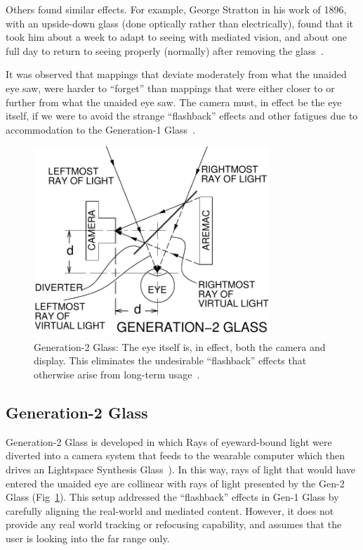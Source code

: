 Others found similar effects. For example, George Stratton in his work of 1896, with an upside-down 
glass
(done optically rather than electrically), found that it took him about a week to adapt to seeing with 
mediated vision, and about one full day to return to seeing properly (normally) after removing the 
glass~\cite{stratton1897vision}.

It was observed that mappings that deviate moderately from what the unaided eye saw, were harder to 
``forget'' than mappings that were either closer to or further from what the unaided eye saw.  The 
camera must, in effect be the eye itself, if we were to avoid the strange ``flashback'' effects and other 
fatigues due to accommodation to the Generation-1 Glass~\cite{schor1987fatigue}.

\begin{figure}
  \center
  \includegraphics[width=3.5in]{ch6/figs/GlassGen2.pdf}
  \caption{Generation-2 Glass: The eye itself is, in effect, both the camera
           and display.  This eliminates the undesirable ``flashback'' effects
           that otherwise arise from long-term usage~\cite{mann2013freeglass}.}
  \label{fig:gentwo}
\end{figure}

\subsection{Generation-2 Glass}
Generation-2 Glass is developed in which Rays of eyeward-bound light were diverted into a camera 
system that feeds to the wearable computer which then drives an Lightspace Synthesis 
Glass~\cite{mann2001aremac}). In this way, rays of light that would have entered the unaided eye are 
collinear with rays of light presented by the Gen-2 Glass (Fig~\ref{fig:gentwo}). This setup addressed 
the ``flashback'' effects in Gen-1 Glass by carefully aligning the real-world and mediated content. 
However, it does not provide any real world tracking or refocusing capability, and assumes that the 
user is looking into the far range only.

